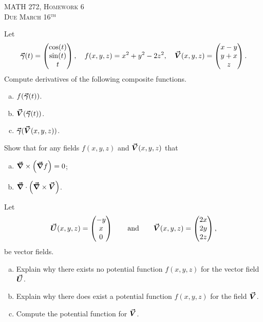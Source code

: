 \documentclass[12pt]{article} %
\begin{document}
\begin{center}
   \textsc{\large MATH 272, Homework 6}\\
   \textsc{Due March 16$^\textrm{th}$}
\end{center}
\vspace{.5cm}


\begin{problem} 
Let 
\[
\boldsymbol{\vec{\gamma}}(t) = \begin{pmatrix} \cos(t) \\ \sin(t) \\ t \end{pmatrix}, \quad f(x,y,z) = x^2 + y^2 - 2z^2, \quad \boldsymbol{\vec{V}}(x,y,z) = \begin{pmatrix} x-y \\ y+x \\ z \end{pmatrix}.
\]
Compute derivatives of the following composite functions.
\begin{enumerate}[(a)]
	\item $f(\boldsymbol{\vec{\gamma}}(t))$.
	\item $\boldsymbol{\vec{V}}(\boldsymbol{\vec{\gamma}}(t))$.
	\item $\boldsymbol{\vec{\gamma}}(\boldsymbol{\vec{V}}(x,y,z))$.
\end{enumerate}
\end{problem}

\begin{problem}
Show that for any fields $f(x,y,z)$ and $\boldsymbol{\vec{V}}(x,y,z)$ that
\begin{enumerate}[(a)]
	\item $\boldsymbol{\vec{\nabla}} \times \left(\boldsymbol{\vec{\nabla}} f\right)=0$;
	\item $\boldsymbol{\vec{\nabla}} \cdot \left(\boldsymbol{\vec{\nabla}} \times \boldsymbol{\vec{V}}\right)$.
\end{enumerate}
\end{problem}

\begin{problem}
	Let 
	\[
	\boldsymbol{\vec{U}}(x,y,z) = \begin{pmatrix} -y \\ x \\ 0 \end{pmatrix} \qquad \textrm{and} \qquad \boldsymbol{\vec{V}}(x,y,z) = \begin{pmatrix} 2x \\ 2y \\ 2z \end{pmatrix},
	\] 
	be vector fields.  
	\begin{enumerate}[(a)]
		\item Explain why there exists no potential function $f(x,y,z)$ for the vector field $\boldsymbol{\vec{U}}$.
		\item Explain why there does exist a potential function $f(x,y,z)$ for the field $\boldsymbol{\vec{V}}$.
		\item Compute the potential function for $\boldsymbol{\vec{V}}$.
	\end{enumerate}
\end{problem}
\end{document}

